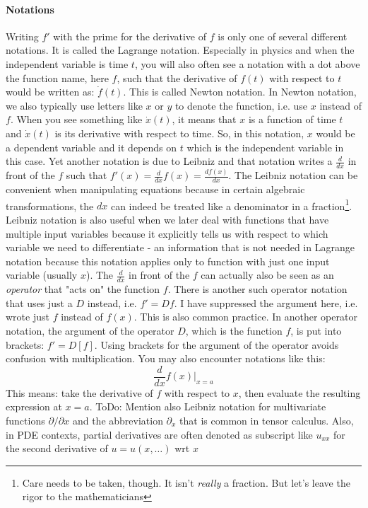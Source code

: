 \paragraph{Notations} Writing $f'$ with the prime for the derivative of $f$ is only one of several different notations. It is called the Lagrange notation. Especially in physics and when the independent variable is time $t$, you will also often see a notation with a dot above the function name, here $f$, such that the derivative of $f(t)$ with respect to $t$ would be written as: $\dot{f}(t)$. This is called Newton notation. In Newton notation, we also typically use letters like $x$ or $y$ to denote the function, i.e. use $x$ instead of $f$. When you see something like $\dot{x}(t)$, it means that $x$ is a function of time $t$ and $\dot{x}(t)$ is its derivative with respect to time. So, in this notation, $x$ would be a dependent variable and it depends on $t$ which is the independent variable in this case. Yet another notation is due to Leibniz and that notation writes a $\frac{d}{dx}$ in front of the $f$ such that $f'(x) = \frac{d}{dx} f(x) = \frac{d f(x)}{dx}$. The Leibniz notation can be convenient when manipulating equations because in certain algebraic transformations, the $dx$ can indeed be treated like a denominator in a fraction\footnote{Care needs to be taken, though. It isn't \emph{really} a fraction. But let's leave the rigor to the mathematicians}. Leibniz notation is also useful when we later deal with functions that have multiple input variables because it explicitly tells us with respect to which variable we need to differentiate - an information that is not needed in Lagrange notation because this notation applies only to function with just one input variable (usually $x$). The $\frac{d}{dx}$ in front of the $f$ can actually also be seen as an \emph{operator} that "acts on" the function $f$. There is another such operator notation that uses just a $D$ instead, i.e. $f' = D f$. I have suppressed the argument here, i.e. wrote just $f$ instead of $f(x)$. This is also common practice. In another operator notation, the argument of the operator $D$, which is the function $f$, is put into brackets: $f' = D[f]$. Using brackets for the argument of the operator avoids confusion with multiplication. You may also encounter notations like this:
\begin{equation}
	\frac{d}{d x} f(x) \bigg\rvert_{x=a}
\end{equation}
This means: take the derivative of $f$ with respect to $x$, then evaluate the resulting expression at $x = a$. ToDo: Mention also Leibniz notation for multivariate functions $\partial / \partial x$ and the abbreviation $\partial_x$ that is common in tensor calculus. Also, in PDE contexts, partial derivatives are often denoted as subscript like $u_{xx}$ for the second derivative of $u = u(x,\ldots)$ wrt $x$

